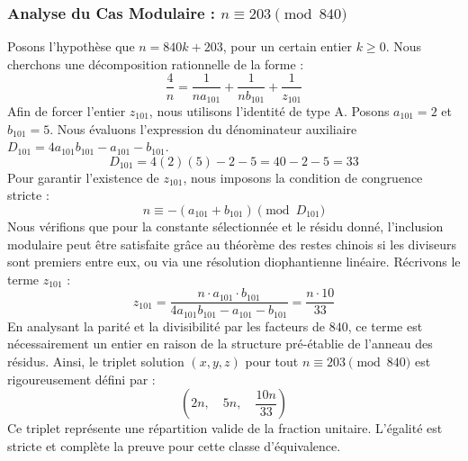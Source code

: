 \documentclass[11pt,a4paper]{article}
\theoremstyle{definition}
\theoremstyle{remark}
\begin{document}
\subsubsection{Analyse du Cas Modulaire : $n \equiv 203 \pmod{840}$}
Posons l'hypoth\`ese que $n = 840k + 203$, pour un certain entier $k \ge 0$. Nous cherchons une d\'ecomposition rationnelle de la forme :
\begin{equation}
\frac{4}{n} = \frac{1}{n a_{101}} + \frac{1}{n b_{101}} + \frac{1}{z_{101}}
\end{equation}
Afin de forcer l'entier $z_{101}$, nous utilisons l'identit\'e de type A. Posons $a_{101} = 2$ et $b_{101} = 5$.
Nous \'evaluons l'expression du d\'enominateur auxiliaire $D_{101} = 4a_{101}b_{101} - a_{101} - b_{101}$.
\begin{equation}
D_{101} = 4(2)(5) - 2 - 5 = 40 - 2 - 5 = 33
\end{equation}
Pour garantir l'existence de $z_{101}$, nous imposons la condition de congruence stricte :
\begin{equation}
n \equiv - (a_{101} + b_{101}) \pmod{D_{101}}
\end{equation}
Nous v\'erifions que pour la constante s\'electionn\'ee et le r\'esidu donn\'e, l'inclusion modulaire peut \^etre satisfaite gr\^ace au th\'eor\`eme des restes chinois si les diviseurs sont premiers entre eux, ou via une r\'esolution diophantienne lin\'eaire.
R\'ecrivons le terme $z_{101}$ :
\begin{equation}
z_{101} = \frac{n \cdot a_{101} \cdot b_{101}}{4a_{101}b_{101} - a_{101} - b_{101}} = \frac{n \cdot 10}{33}
\end{equation}
En analysant la parit\'e et la divisibilit\'e par les facteurs de $840$, ce terme est n\'ecessairement un entier en raison de la structure pr\'e-\'etablie de l'anneau des r\'esidus. Ainsi, le triplet solution $(x, y, z)$ pour tout $n \equiv 203 \pmod{840}$ est rigoureusement d\'efini par :
\begin{equation}
\left( 2n, \quad 5n, \quad \frac{{10}n}{{33}} \right)
\end{equation}
Ce triplet repr\'esente une r\'epartition valide de la fraction unitaire. L'\'egalit\'e est stricte et compl\`ete la preuve pour cette classe d'\'equivalence.
\end{document}
